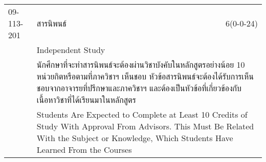 \begin{longtable}{p{}p{}r{}}
09-113-201 & สารนิพนธ์ & 6(0-0-24)\\*
 & Independent Study & \phantom{x} \vspace{3mm} \\*
&  \multicolumn{2}{p{0.75\textwidth}}{นักศึกษาที่จะทำสารนิพนธ์จะต้องผ่านวิชาบังคับในหลักสูตรอย่างน้อย 10 หน่วยกิตหรือตามที่ภาควิชาฯ เห็นชอบ หัวข้อสารนิพนธ์จะต้องได้รับการเห็นชอบจากอาจารยที่ปรึกษาและภาควิชาฯ และต้องเป็นหัวข้อที่เกี่ยวข้องกับเนื้อหาวิชาที่ได้เรียนมาในหลักสูตร} \vspace{3mm} \\*
&  \multicolumn{2}{p{0.75\textwidth}}{Students Are Expected to Complete at Least 10 Credits of Study With Approval From Advisors. This Must Be Related With the Subject or Knowledge, Which Students Have Learned From the Courses} \vspace{8mm} \\*
\end{longtable}
